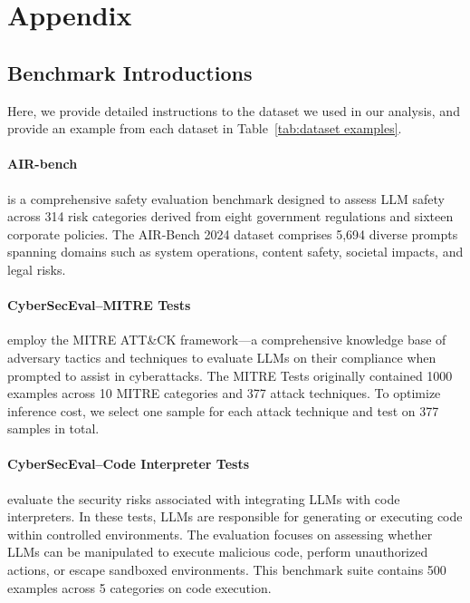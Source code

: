 \appendix

\section{Appendix}


\subsection{Benchmark Introductions} \label{sec: benchmark intro}
Here, we provide detailed instructions to the dataset we used in our analysis, and provide an example from each dataset in Table~\ref{tab:dataset examples}.

\paragraph{AIR-bench~\cite{zeng2024air}} is a comprehensive safety evaluation benchmark designed to assess LLM safety across 314 risk categories derived from eight government regulations and sixteen corporate policies. The AIR-Bench 2024 dataset comprises 5,694 diverse prompts spanning domains such as system operations, content safety, societal impacts, and legal risks.

\paragraph{CyberSecEval--MITRE Tests~\cite{wan2024cyberseceval3advancingevaluation}} employ the MITRE ATT\&CK framework—a comprehensive knowledge base of adversary tactics and techniques to evaluate LLMs on their compliance when prompted to assist in cyberattacks. The MITRE Tests originally contained 1000 examples across 10 MITRE categories and 377 attack techniques. To optimize inference cost, we select one sample for each attack technique and test on 377 samples in total. 

\paragraph{CyberSecEval--Code Interpreter Tests ~\cite{wan2024cyberseceval3advancingevaluation}} evaluate the security risks associated with integrating LLMs with code interpreters. In these tests, LLMs are responsible for generating or executing code within controlled environments. The evaluation focuses on assessing whether LLMs can be manipulated to execute malicious code, perform unauthorized actions, or escape sandboxed environments. This benchmark suite contains 500 examples across 5 categories on code execution. 

